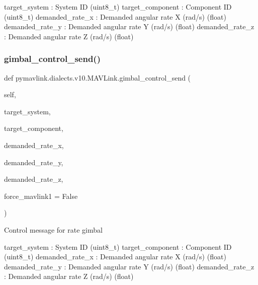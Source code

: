 \begin{DoxyVerb}
\begin{DoxyVerb}
\begin{DoxyVerb}
target_system             : System ID (uint8_t)
target_component          : Component ID (uint8_t)
demanded_rate_x           : Demanded angular rate X (rad/s) (float)
demanded_rate_y           : Demanded angular rate Y (rad/s) (float)
demanded_rate_z           : Demanded angular rate Z (rad/s) (float)\end{DoxyVerb}
 \mbox{\label{classpymavlink_1_1dialects_1_1v10_1_1MAVLink_a276bf2c6e2b1e1e983e30a4eede1ba5c}} 
\subsubsection{\texorpdfstring{gimbal\+\_\+control\+\_\+send()}{gimbal\_control\_send()}}
{\footnotesize\ttfamily def pymavlink.\+dialects.\+v10.\+M\+A\+V\+Link.\+gimbal\+\_\+control\+\_\+send (\begin{DoxyParamCaption}\item[{}]{self,  }\item[{}]{target\+\_\+system,  }\item[{}]{target\+\_\+component,  }\item[{}]{demanded\+\_\+rate\+\_\+x,  }\item[{}]{demanded\+\_\+rate\+\_\+y,  }\item[{}]{demanded\+\_\+rate\+\_\+z,  }\item[{}]{force\+\_\+mavlink1 = {\ttfamily False} }\end{DoxyParamCaption})}

\begin{DoxyVerb}Control message for rate gimbal

target_system             : System ID (uint8_t)
target_component          : Component ID (uint8_t)
demanded_rate_x           : Demanded angular rate X (rad/s) (float)
demanded_rate_y           : Demanded angular rate Y (rad/s) (float)
demanded_rate_z           : Demanded angular rate Z (rad/s) (float)\end{DoxyVerb}
 \mbox{\label{classpymavlink_1_1dialects_1_1v10_1_1MAVLink_ac3561e3db2717234632a78c8d0d04088}} 

\end{DoxyVerb}
\end{DoxyVerb}
